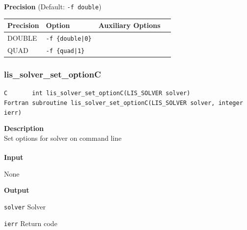 \documentclass[a4paper]{article}
\newcommand{\namelistlabel}[1]{\mbox{#1}\hfill}
\newenvironment{namelist}[1]{%
 \begin{list}{}
  {\let\makelabel\namelistlabel
  \settowidth{\labelwidth}{#1}
  \setlength{\leftmargin}{1.1\labelwidth}}
}{%
\end{list}}
\begin{document}
\\ \\
\begin{minipage}[t]{\textwidth}
\begin{center}
{\bf Precision} (Default: \verb=-f double=)\\
\begin{tabular}{l|lll}\hline\hline
Precision     & Option           & Auxiliary Options \\ \hline
DOUBLE   & \verb=-f {double|0}=    &   \\
QUAD     & \verb=-f {quad|1}=      &   \\
\hline         
\end{tabular}
\end{center}
\end{minipage}
\newpage
  \subsubsection{lis\_solver\_set\_optionC}
\begin{screen}
\verb|C       int lis_solver_set_optionC(LIS_SOLVER solver)|\\
\verb|Fortran subroutine lis_solver_set_optionC(LIS_SOLVER solver, integer ierr)|
\end{screen}
{\bf Description}\\
\indent
Set options for solver on command line
\\ \\
\noindent
{\bf Input}
\begin{namelist}{XXXXXXXXXXXXXXXXXXXX}
\item[None]
\end{namelist}
{\bf Output}
\begin{namelist}{XXXXXXXXXXXXXXXXXXXX}
\item[\tt solver] Solver
\item[\tt ierr] Return code
\end{namelist}
\newpage
\end{document}
